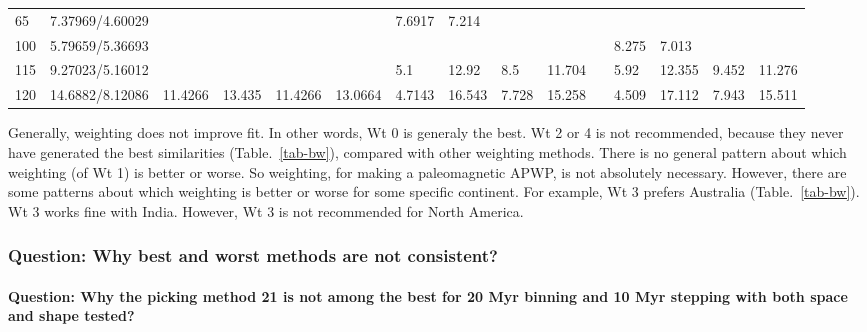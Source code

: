 \begin{table*}
{\begin{tabular}{|l|l|llllllllllllll}
65 & 7.37969/4.60029 & \multicolumn{4}{l}{} & \multicolumn{1}{l|}{7.6917} & \multicolumn{1}{l|}{7.214} & \multicolumn{2}{l}{} & \multicolumn{2}{l}{} & \multicolumn{2}{l}{} & \multicolumn{2}{l}{} \\ \cline{1-2} \cline{7-8} \cline{13-14}
100 & 5.79659/5.36693 & \multicolumn{4}{l}{} & \multicolumn{2}{l}{} & \multicolumn{2}{l}{\multirow{-4}{*}{}} & \multicolumn{2}{l}{} & \multicolumn{1}{l|}{8.275} & \multicolumn{1}{l|}{7.013} & \multicolumn{2}{l}{\multirow{-4}{*}{}} \\ \cline{1-2} \cline{7-10} \cline{13-16} 
115 & 9.27023/5.16012 & \multicolumn{4}{l}{\multirow{-6}{*}{}} & \multicolumn{1}{l|}{5.1} & \multicolumn{1}{l|}{12.92} & \multicolumn{1}{l|}{8.5} & \multicolumn{1}{l|}{11.704} & \multicolumn{2}{l}{} & \multicolumn{1}{l|}{5.92} & \multicolumn{1}{l|}{12.355} & \multicolumn{1}{l|}{9.452} & \multicolumn{1}{l|}{11.276} \\ \cline{1-10} \cline{13-16} 
120 & 14.6882/8.12086 & \multicolumn{1}{l|}{11.4266} & \multicolumn{1}{l|}{13.435} & \multicolumn{1}{l|}{11.4266} & \multicolumn{1}{l|}{13.0664} & \multicolumn{1}{l|}{4.7143} & \multicolumn{1}{l|}{16.543} & \multicolumn{1}{l|}{7.728} & \multicolumn{1}{l|}{15.258} & \multicolumn{2}{l}{\multirow{-7}{*}{}} & \multicolumn{1}{l|}{4.509} & \multicolumn{1}{l|}{17.112} & \multicolumn{1}{l|}{7.943} & \multicolumn{1}{l|}{15.511} \\ \cline{1-10} \cline{13-16} 
\end{tabular}%
}
\end{table*}

Generally, weighting does not improve fit. In other words, Wt 0 is generaly the
best. Wt 2 or 4 is not recommended, because they never have generated the best
similarities (Table.~\ref{tab-bw}), compared with other weighting methods. There
is no general pattern about which weighting (of Wt 1) is better or
worse. So weighting, for making a paleomagnetic APWP, is not absolutely
necessary. However, there are some patterns about which weighting is better or
worse for some specific continent. For example, Wt 3 prefers Australia
(Table.~\ref{tab-bw}). Wt 3 works fine with India. However, Wt 3 is not
recommended for North America.

\subsubsection{Question: Why best and worst methods are not consistent?}
\paragraph{Question: Why the picking method 21 is not among the best for
20 Myr binning and 10 Myr stepping with both space and shape tested?}

